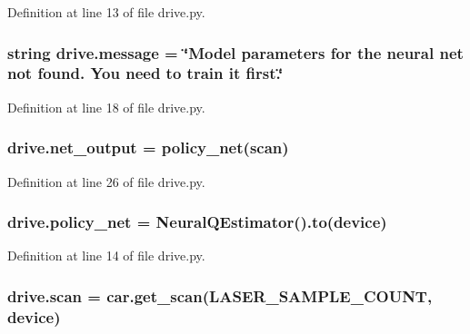 Definition at line 13 of file drive.\+py.

\subsubsection[{\texorpdfstring{message}{message}}]{\setlength{\rightskip}{0pt plus 5cm}string drive.\+message = \char`\"{}Model parameters for the neural net not found. You need to train it first.\char`\"{}}\hypertarget{namespacedrive_a82ba3ae0a4aeed9a874c1d9f87e147fd}{}\label{namespacedrive_a82ba3ae0a4aeed9a874c1d9f87e147fd}


Definition at line 18 of file drive.\+py.

\subsubsection[{\texorpdfstring{net\+\_\+output}{net_output}}]{\setlength{\rightskip}{0pt plus 5cm}drive.\+net\+\_\+output = {\bf policy\+\_\+net}({\bf scan})}\hypertarget{namespacedrive_aa0be36d022218be529fdf22d34a4dfc7}{}\label{namespacedrive_aa0be36d022218be529fdf22d34a4dfc7}


Definition at line 26 of file drive.\+py.

\subsubsection[{\texorpdfstring{policy\+\_\+net}{policy_net}}]{\setlength{\rightskip}{0pt plus 5cm}drive.\+policy\+\_\+net = {\bf Neural\+Q\+Estimator}().to({\bf device})}\hypertarget{namespacedrive_a2e630ff72576502d513dc46034787985}{}\label{namespacedrive_a2e630ff72576502d513dc46034787985}


Definition at line 14 of file drive.\+py.

\subsubsection[{\texorpdfstring{scan}{scan}}]{\setlength{\rightskip}{0pt plus 5cm}drive.\+scan = {\bf car.\+get\+\_\+scan}(L\+A\+S\+E\+R\+\_\+\+S\+A\+M\+P\+L\+E\+\_\+\+C\+O\+U\+NT, {\bf device})}\hypertarget{namespacedrive_a082ee6b5d0f5566c851367e7c7792ea5}{}\label{namespacedrive_a082ee6b5d0f5566c851367e7c7792ea5}


